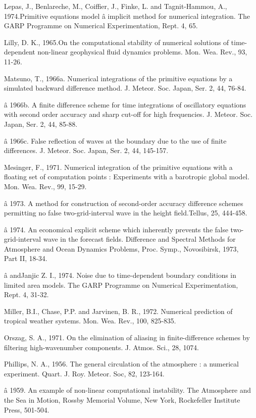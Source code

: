 Lepas, J., Benlareche, M., Coiffier, J., Finke, L. and Tagnit-Hammou,
A., 1974.Primitive equations model â implicit method for numerical
integration. The GARP Programme on Numerical Experimentation, Rept. 4,
65.

Lilly, D. K., 1965.On the computational stability of numerical solutions
of time-dependent non-linear geophysical fluid dynamics problems. Mon.
Wea. Rev., 93, 11-26.

Matsuno, T., 1966a. Numerical integrations of the primitive equations
by a simulated backward difference method. J. Meteor. Soc. Japan, Ser.
2, 44, 76-84.

â 1966b. A finite difference scheme for time integrations of
oscillatory equations with second order accuracy and sharp cut-off for
high frequencies. J. Meteor. Soc. Japan, Ser. 2, 44, 85-88.

â 1966c. False reflection of waves at the boundary due to the use of
finite differences. J. Meteor. Soc. Japan, Ser. 2, 44, 145-157.

Mesinger, F., 1971. Numerical integration of the primitive equations
with a floating set of computation points : Experiments with a
barotropic global model. Mon. Wea. Rev., 99, 15-29.

â 1973. A method for construction of second-order accuracy difference
schemes permitting no false two-grid-interval wave in the height
field.Tellus, 25, 444-458.

â 1974. An economical explicit scheme which inherently prevents the
false two-grid-interval wave in the forecast fields. Difference and
Spectral Methods for Atmosphere and Ocean Dynamics Problems, Proc.
Symp., Novosibirsk, 1973, Part II, 18-34.

â andJanjic Z. I., 1974. Noise due to time-dependent boundary conditions
in limited area models. The GARP Programme on Numerical Experimentation,
Rept. 4, 31-32.

Miller, B.I., Chase, P.P. and Jarvinen, B. R., 1972. Numerical
prediction of tropical weather systems. Mon. Wea. Rev., 100, 825-835.

Orszag, S. A., 1971. On the elimination of aliasing in finite-difference
schemes by filtering high-wavenumber components. J. Atmos. Sci., 28,
1074.

Phillips, N. A., 1956. The general circulation of the atmosphere : a
numerical experiment. Quart. J. Roy. Meteor. Soc, 82, 123-164.

â 1959. An example of non-linear computational instability. The
Atmosphere and the Sea in Motion, Rossby Memorial Volume, New York,
Rockefeller Institute Press, 501-504.

